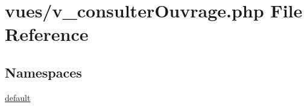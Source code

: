 \hypertarget{v__consulter_ouvrage_8php}{}\section{vues/v\+\_\+consulter\+Ouvrage.php File Reference}
\label{v__consulter_ouvrage_8php}
\subsection*{Namespaces}
\begin{DoxyCompactItemize}
\item 
 \hyperlink{namespacedefault}{default}
\end{DoxyCompactItemize}
